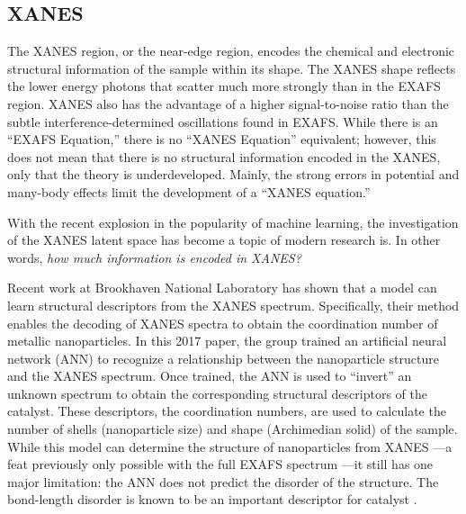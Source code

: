 \subsection{XANES}
The XANES region, or the near-edge region, encodes the chemical and electronic structural information of the sample within its shape. The XANES shape reflects the lower energy photons that scatter much more strongly than in the EXAFS region. XANES also has the advantage of a higher signal-to-noise ratio than the subtle interference-determined oscillations found in EXAFS. While there is an ``EXAFS Equation,'' there is no ``XANES Equation'' equivalent; however, this does not mean that there is no structural information encoded in the XANES, only that the theory is underdeveloped. Mainly, the strong errors in potential and many-body effects limit the development of a ``XANES equation.'' 

With the recent explosion in the popularity of machine learning, the investigation of the XANES latent space has become a topic of modern research is. In other words, \textit{how much information is encoded in XANES?}

Recent work at Brookhaven National Laboratory \cite{Timoshenko2017} has shown that a model can learn structural descriptors from the XANES spectrum. Specifically, their method enables the decoding of XANES spectra to obtain the coordination number of metallic nanoparticles. In this 2017 paper, the group trained an artificial neural network (ANN) to recognize a relationship between the nanoparticle structure and the XANES spectrum. Once trained, the ANN is used to ``invert'' an unknown spectrum to obtain the corresponding structural descriptors of the catalyst. These descriptors, the coordination numbers, are used to calculate the number of shells (nanoparticle size) and shape (Archimedian solid) of the sample. While this model can determine the structure of nanoparticles from XANES ---a feat previously only possible with the full EXAFS spectrum ---it still has one major limitation: the ANN does not predict the disorder of the structure. The bond-length disorder is known to be an important descriptor for catalyst \cite{catalyst-strain-dependence} \cite{co-strain-effects}.


